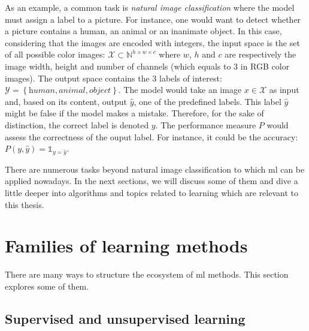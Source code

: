 As an example, a common task is \textit{natural image classification} where the model must assign a label to a picture. For instance, one would want to detect whether a picture contains a human, an animal or an inanimate object. In this case, considering that the images are encoded with integers, the input space is the set of all possible color images: $\mathcal{X} \subset \mathbb{N}^{h\times w\times c}$ where $w$, $h$ and $c$ are respectively the image width, height and number of channels (which equals to 3 in RGB color images). The output space contains the 3 labels of interest: $\mathcal{Y} = \left\{\textit{human}, \textit{animal}, \textit{object}\right\}$. The model would take an image $x \in \mathcal{X}$ as input and, based on its content, output $\hat{y}$, one of the predefined labels. This label $\hat{y}$ might be false if the model makes a mistake. Therefore, for the sake of distinction, the correct label is denoted $y$. The performance measure $P$ would assess the correctness of the ouput label. For instance, it could be the accuracy: $P(y, \hat{y}) = \mathbb{1}_{y=\hat{y}}$.

There are numerous tasks beyond natural image classification to which \acrlong{ml} can be applied nowadays. In the next sections, we will discuss some of them and dive a little deeper into algorithms and topics related to learning which are relevant to this thesis.


\section{Families of learning methods}
\label{sec:backml:families}

There are many ways to structure the ecosystem of \acrlong{ml} methods. This section explores some of them.

\subsection{Supervised and unsupervised learning}
\label{ssec:backml:supvsunsup}

